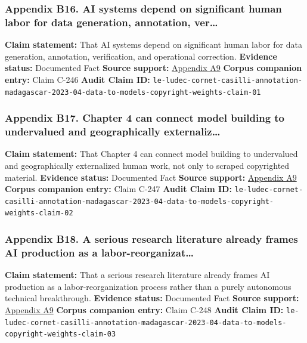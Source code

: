 \documentclass[
  american,
  11pt,
  letterpaper,
]{article}
\begin{document}
\subsubsection{Appendix B16. AI systems depend on significant human
labor for data generation, annotation,
ver\ldots{}}\label{appendix-b16-ai-systems-depend-on-significant-human-labor-for-data-generation-annotation-ver}

\textbf{Claim statement:} That AI systems depend on significant human
labor for data generation, annotation, verification, and operational
correction. \textbf{Evidence status:} Documented Fact \textbf{Source
support:}
\hyperref[appendix-a9-the-problem-with-annotation-human-labour-and-outsourcing-between-france-and-madagascar]{Appendix
A9} \textbf{Corpus companion entry:} Claim C-246 \textbf{Audit Claim
ID:}
\texttt{le-ludec-cornet-casilli-annotation-madagascar-2023-04-data-to-models-copyright-weights-claim-01}

\subsubsection{Appendix B17. Chapter 4 can connect model building to
undervalued and geographically
externaliz\ldots{}}\label{appendix-b17-chapter-4-can-connect-model-building-to-undervalued-and-geographically-externaliz}

\textbf{Claim statement:} That Chapter 4 can connect model building to
undervalued and geographically externalized human work, not only to
scraped copyrighted material. \textbf{Evidence status:} Documented Fact
\textbf{Source support:}
\hyperref[appendix-a9-the-problem-with-annotation-human-labour-and-outsourcing-between-france-and-madagascar]{Appendix
A9} \textbf{Corpus companion entry:} Claim C-247 \textbf{Audit Claim
ID:}
\texttt{le-ludec-cornet-casilli-annotation-madagascar-2023-04-data-to-models-copyright-weights-claim-02}

\subsubsection{Appendix B18. A serious research literature already
frames AI production as a
labor-reorganizat\ldots{}}\label{appendix-b18-a-serious-research-literature-already-frames-ai-production-as-a-labor-reorganizat}

\textbf{Claim statement:} That a serious research literature already
frames AI production as a labor-reorganization process rather than a
purely autonomous technical breakthrough. \textbf{Evidence status:}
Documented Fact \textbf{Source support:}
\hyperref[appendix-a9-the-problem-with-annotation-human-labour-and-outsourcing-between-france-and-madagascar]{Appendix
A9} \textbf{Corpus companion entry:} Claim C-248 \textbf{Audit Claim
ID:}
\texttt{le-ludec-cornet-casilli-annotation-madagascar-2023-04-data-to-models-copyright-weights-claim-03}
\end{document}
